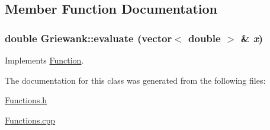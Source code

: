 \subsection{Member Function Documentation}
\hypertarget{classGriewank_c34b1c32bfb7b867c6772db5cc6a727f}{
\subsubsection{\setlength{\rightskip}{0pt plus 5cm}double Griewank::evaluate (vector$<$ double $>$ \& {\em x})}}
\label{classGriewank_c34b1c32bfb7b867c6772db5cc6a727f}




Implements \hyperlink{classFunction_9323a7309b16e0e168590e34b359ff32}{Function}.

The documentation for this class was generated from the following files:\begin{CompactItemize}
\item 
\hyperlink{Functions_8h}{Functions.h}\item 
\hyperlink{Functions_8cpp}{Functions.cpp}\end{CompactItemize}
